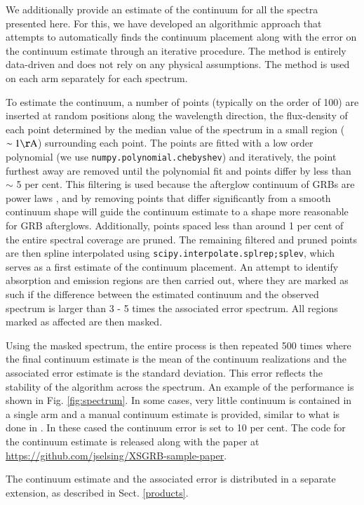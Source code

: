 \documentclass{aa}    %
\begin{document}
We additionally provide an estimate of the continuum for all the spectra
presented here. For this, we have developed an algorithmic approach that
attempts to automatically finds the continuum placement along with the error on
the continuum estimate through an iterative procedure. The method is entirely
data-driven and does not rely on any physical assumptions. The method is used on
each arm separately for each spectrum.

To estimate the continuum, a number of points (typically on the order of 100)
are inserted at random positions along the wavelength direction, the
flux-density of each point determined by the median value of the spectrum in a
small region ($\sim 1 \mathrm{\AA}$) surrounding each point. The points are
fitted with a low order polynomial (we use \texttt{numpy.polynomial.chebyshev})
and iteratively, the point furthest away are removed until the polynomial fit
and points differ by less than $\sim$ 5 per cent. This filtering is used because
the afterglow continuum of GRBs are power laws \citep{Piran2005}, and by
removing points that differ significantly from a smooth continuum shape will
guide the continuum estimate to a shape more reasonable for GRB afterglows.
Additionally, points spaced less than around 1 per cent of the entire spectral
coverage are pruned. The remaining filtered and pruned points are then spline
interpolated using \texttt{scipy.interpolate.splrep;splev}, which serves as a
first estimate of the continuum placement. An attempt to identify absorption and
emission regions are then carried out, where they are marked as such if the
difference between the estimated continuum and the observed spectrum is larger
than 3 - 5 times the associated error spectrum. All regions marked as affected are then masked.

Using the masked spectrum, the entire process is then repeated 500 times where
the final continuum estimate is the mean of the continuum realizations and the
associated error estimate is the standard deviation. This error reflects the
stability of the algorithm across the spectrum. An example of the performance is
shown in Fig. \ref{fig:spectrum}. In some cases, very little continuum is
contained in a single arm and a manual continuum estimate is provided, similar
to what is done in \citet{Lopez2016}. In these cased the continuum error is set
to 10 per cent. The code for the continuum estimate is released along with the
paper at \url{https://github.com/jselsing/XSGRB-sample-paper}.

The continuum estimate and the associated error is distributed in a separate
extension, as described in Sect. \ref{products}.
\end{document}
